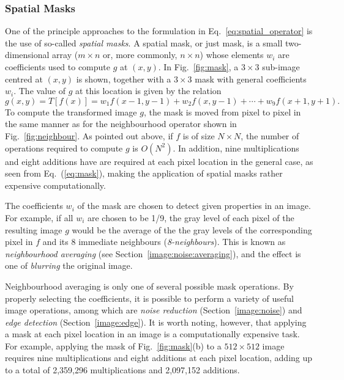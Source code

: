 
\subsubsection{Spatial Masks}
\label{pg:image:spatial:mask}

One of the principle approaches to the formulation in
Eq.~\ref{eq:spatial_operator} is the use of so-called {\em spatial
  masks\/}.  A spatial mask, or just mask, is a small two-dimensional
array ($m\times n$ or, more commonly, $n\times n$) whose elements
$w_{i}$ are coefficients used to compute $g$ at $(x,y)$.  In
Fig.~\ref{fig:mask}, a $3\times 3$ sub-image centred at $(x,y)$ is
shown, together with a $3\times 3$ mask with general coefficients
$w_{i}$.  The value of $g$ at this location is given by the relation
\begin{equation}
\label{eq:mask}
g(x,y)=T[f(x)]=w_{1}f(x-1,y-1)+w_{2}f(x,y-1)+\cdots+w_{9}f(x+1,y+1)\mbox{.}
\end{equation}
To compute the transformed image $g$, the mask is moved from pixel to
pixel in the same manner as for the neighbourhood operator shown in
Fig.~\ref{fig:neighbour}.  As pointed out above, if $f$ is of size
$N\times N$, the number of operations required to compute $g$ is
$O(N^{2})$.  In addition, nine multiplications and eight additions
have are required at each pixel location in the general case, as seen
from Eq.~(\ref{eq:mask}), making the application of spatial masks
rather expensive computationally.

The coefficients $w_{i}$ of the mask are chosen to detect given
properties in an image.  For example, if all $w_{i}$ are chosen to be
1/9, the gray level of each pixel of the resulting image $g$ would be
the average of the the gray levels of the corresponding pixel in $f$
and its 8 immediate neighbours ({\em 8-neighbours\/}).  This is known
as {\em neighbourhood averaging\/} (see
Section~\ref{image:noise:averaging}), and the effect is one of {\em
  blurring\/} the original image.

Neighbourhood averaging is only one of several possible mask
operations.  By properly selecting the coefficients, it is possible to
perform a variety of useful image operations, among which are {\em
  noise reduction\/} (Section~\ref{image:noise}) and {\em edge
  detection\/} (Section~\ref{image:edge}).  It is worth noting,
however, that applying a mask at each pixel location in an image is a
computationally expensive task.  For example, applying the mask of
Fig.~\ref{fig:mask}(b) to a $512\times 512$ image requires nine
multiplications and eight additions at each pixel location, adding up
to a total of 2,359,296 multiplications and 2,097,152 additions.
